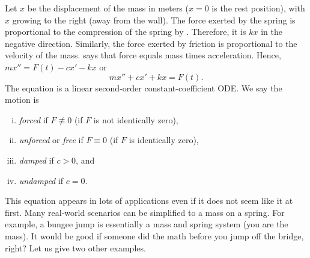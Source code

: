 Let $x$ be the displacement of the mass in meters ($x=0$ is the rest position), with
$x$ growing to the right (away from the wall).
The force exerted by the spring is proportional to the
compression of the spring by .
Therefore, it is $kx$ in the negative direction.
Similarly, the force exerted by friction is proportional
to the velocity of the mass.
 says that force equals mass times
acceleration.
Hence, $mx'' = F(t)-cx'-kx$ or
\begin{equation*}
mx'' + cx' + kx = F(t) .
\end{equation*}
The equation is a linear second-order constant-coefficient ODE\@.
We say the motion is
\begin{enumerate}[(i)]
\item \emph{forced} if $F \not\equiv 0$ (if $F$ is not identically zero),
\item \emph{unforced} or \emph{free} if $F \equiv 0$ (if $F$ is identically zero),
\item \emph{damped} if $c > 0$, and
\item \emph{undamped} if $c = 0$.
\end{enumerate}

This equation appears in lots of applications even if it does not
seem like it at first.  Many real-world scenarios can be simplified to
a mass on a spring.  For example, a bungee jump is essentially a mass
and spring system (you are the mass).  It would be good if someone did the math
before you jump off the bridge, right?  Let us give two other examples.

\medskip

